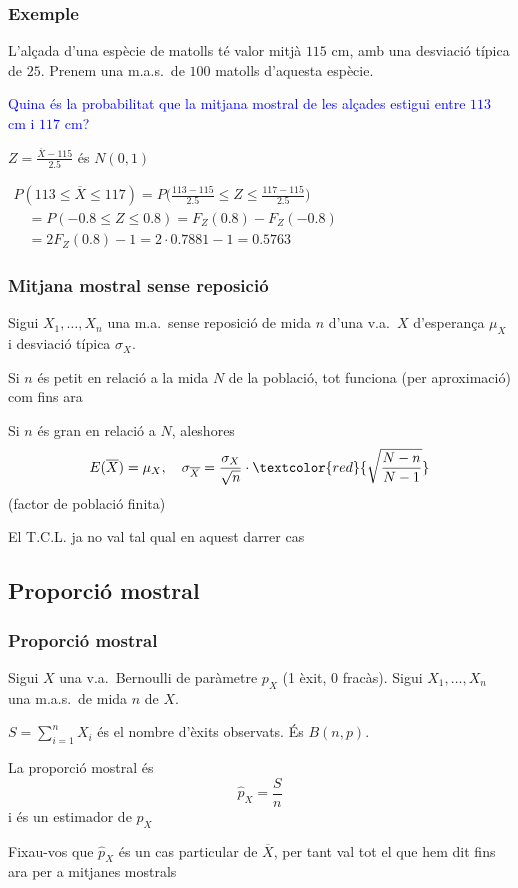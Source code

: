 \documentclass[12pt,t]{beamer}
\newcommand{\red}[1]{\textcolor{red}{#1}}
\newcommand{\blue}[1]{\textcolor{blue}{#1}}
\renewcommand{\emph}[1]{{\color{red}#1}}
\renewcommand{\leq}{\leqslant}
\theoremstyle{plain}
\theoremstyle{definition}
\begin{document}
\begin{frame}
\vspace*{-2ex}

\frametitle{Exemple}
L'alçada d'una espècie de matolls té valor mitjà  $115$ cm, amb una desviació típica de $25$. Prenem una m.a.s.\ de $100$ matolls d'aquesta espècie.
\medskip

\blue{Quina és la probabilitat que la mitjana mostral de les alçades estigui entre $113$ cm i $117$ cm?}
\pause\medskip

$\displaystyle Z=\frac{\overline{X}-115}{2.5}$ és $N(0,1)$
\medskip

$\begin{array}{l}
P(113\leq  \overline{X} \leq 117)  \displaystyle= P\Big(\frac{113-115}{2.5}\leq
  Z \leq \frac{117-115}{2.5}\Big)\\[2ex]
\quad \displaystyle =P(-0.8\leq
  Z \leq 0.8)= F_{Z}(0.8)-F_{Z}(-0.8)\\[1ex]
\quad \displaystyle = 2 F_{Z}(0.8) -1 = 2 \cdot 0.7881-1=0.5763
\end{array}$


\end{frame}








\begin{frame}
\frametitle{Mitjana mostral sense reposició}

Sigui $X_1,\ldots, X_n$ una m.a.\ \emph{sense reposició} de mida $n$ d'una v.a.\ $X$ d'esperança $\mu_X$ i desviació típica $\sigma_X$. 
\medskip

Si $n$ és  petit en relació a la mida $N$ de la població, tot funciona (per aproximació) com fins ara
\medskip

Si $n$ és gran en relació a $N$, aleshores
$$
E(\overline{X})=\mu_X,\quad \sigma_{\overline{X}}=\frac{\sigma_X}{\sqrt{n}}\cdot\red{\sqrt{\frac{N-n}{N-1}}}
$$
(\emph{factor de població finita})
\medskip

El T.C.L. ja no val tal qual en aquest darrer cas



\end{frame}

\subsection{Proporció mostral}
\begin{frame}
\frametitle{Proporció mostral}

Sigui $X$ una v.a.\ Bernoulli de paràmetre $p_X$ (1 èxit, 0 fracàs). Sigui $X_1,\ldots,X_n$ una m.a.s.\ de mida $n$ de $X$. 
\medskip

$S=\sum_{i=1}^n X_i$ és el nombre d'èxits observats. És $B(n,p)$.
\medskip

La \emph{proporció mostral} és 
$$
\widehat{p}_X=\frac{S}{n}
$$
i és un estimador de $p_X$
\medskip

Fixau-vos que $\widehat{p}_X$ és un cas particular de $\overline{X}$, per tant val tot el que hem dit fins ara per a mitjanes mostrals


\end{frame}
\end{document}
